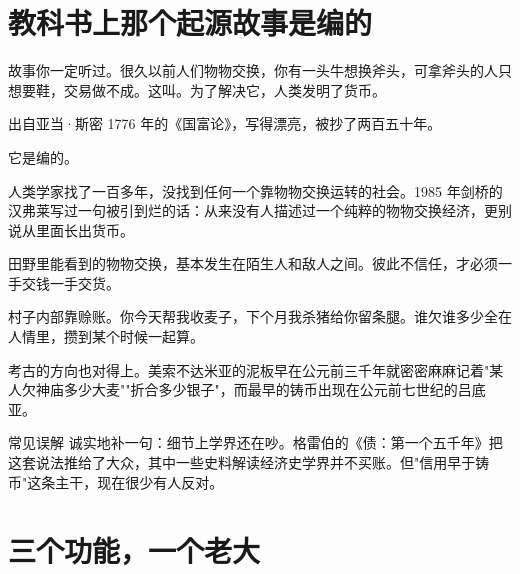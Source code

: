 \section{教科书上那个起源故事是编的}

故事你一定听过。很久以前人们物物交换，你有一头牛想换斧头，可拿斧头的人只想要鞋，交易做不成。这叫。为了解决它，人类发明了货币。

出自亚当·斯密 1776 年的《国富论》，写得漂亮，被抄了两百五十年。

它是编的。

人类学家找了一百多年，没找到任何一个靠物物交换运转的社会。1985 年剑桥的汉弗莱写过一句被引到烂的话：从来没有人描述过一个纯粹的物物交换经济，更别说从里面长出货币。

田野里能看到的物物交换，基本发生在陌生人和敌人之间。彼此不信任，才必须一手交钱一手交货。

村子内部靠赊账。你今天帮我收麦子，下个月我杀猪给你留条腿。谁欠谁多少全在人情里，攒到某个时候一起算。

考古的方向也对得上。美索不达米亚的泥板早在公元前三千年就密密麻麻记着"某人欠神庙多少大麦""折合多少银子"，而最早的铸币出现在公元前七世纪的吕底亚。

\begin{mythbox}{常见误解}
诚实地补一句：细节上学界还在吵。格雷伯的《债：第一个五千年》把这套说法推给了大众，其中一些史料解读经济史学界并不买账。但"信用早于铸币"这条主干，现在很少有人反对。

\end{mythbox}

\section{三个功能，一个老大}

\begin{flowlist}
\end{flowlist}

